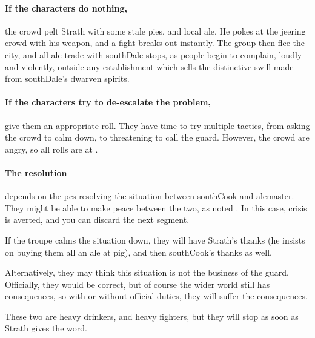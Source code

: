 \paragraph{If the characters do nothing,}
the crowd pelt Strath with some stale pies, and local ale.
He pokes at the jeering crowd with his weapon, and a fight breaks out instantly.
The group then flee the city, and all ale trade with \gls{southDale} stops, as people begin to complain, loudly and violently, outside any establishment which sells the distinctive swill made from \gls{southDale}'s dwarven spirits.

\paragraph{If the characters try to de-escalate the problem,}
give them an appropriate roll.
They have time to try multiple tactics, from asking the crowd to calm down, to threatening to call the guard.
However, the crowd are angry, so all rolls are at \tn[10].

\paragraph{The resolution}
depends on the \glspl{pc} resolving the situation between \gls{southCook} and \gls{alemaster}.
They might be able to make peace between the two, as noted .
In this case, crisis is averted, and you can discard the next \gls{segment}.

If the troupe calms the situation down, they will have Strath's thanks (he insists on buying them all an ale at \gls{pig}), and then \gls{southCook}'s thanks as well.

Alternatively, they may think this situation is not the business of the \gls{guard}.
Officially, they would be correct, but of course the wider world still has consequences, so with or without official duties, they will suffer the consequences.



These two are heavy drinkers, and heavy fighters, but they will stop as soon as Strath gives the word.


\southCook

